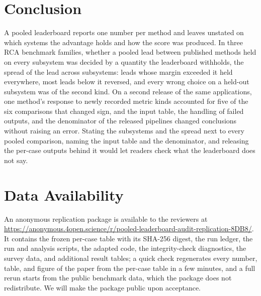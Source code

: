 \section{Conclusion}
\label{sec:conclusion}

A pooled leaderboard reports one number per method and leaves unstated on which systems the advantage holds and how the score was produced.
In three RCA benchmark families, whether a pooled lead between published methods held on every subsystem was decided by a quantity the leaderboard withholds, the spread of the lead across subsystems: leads whose margin exceeded it held everywhere, most leads below it reversed, and every wrong choice on a held-out subsystem was of the second kind.
On a second release of the same applications, one method's response to newly recorded metric kinds accounted for five of the six comparisons that changed sign, and the input table, the handling of failed outputs, and the denominator of the released pipelines changed conclusions without raising an error.
Stating the subsystems and the spread next to every pooled comparison, naming the input table and the denominator, and releasing the per-case outputs behind it would let readers check what the leaderboard does not say.

\section*{Data Availability}
An anonymous replication package is available to the reviewers at \url{https://anonymous.4open.science/r/pooled-leaderboard-audit-replication-8DB8/}.
It contains the frozen per-case table with its SHA-256 digest, the run ledger, the run and analysis scripts, the adapted \simplerca code, the integrity-check diagnostics, the survey data, and additional result tables; a quick check regenerates every number, table, and figure of the paper from the per-case table in a few minutes, and a full rerun starts from the public benchmark data, which the package does not redistribute.
We will make the package public upon acceptance.
